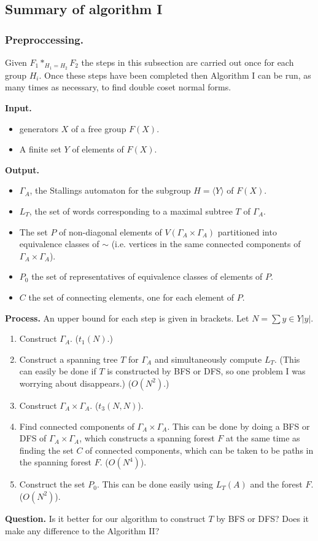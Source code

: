 \documentclass[a4paper,12pt]{article}
\newcommand{\G}{\Gamma }
\numberwithin{equation}{section}
\numberwithin{figure}{section}
\newcommand{\la}{\langle}
\newcommand{\ra}{\rangle}
\newcommand{\be}{\begin{enumerate}}
\newcommand{\ee}{\end{enumerate}}
\newcommand{\biz}{\begin{itemize}}
\newcommand{\eiz}{\end{itemize}}
\begin{document}
\subsection{Summary of algorithm I}
\subsubsection{Preproccessing.}
Given $F_1*_{H_1=H_2} F_2$
 the
steps in this subsection are carried out once for
each group $H_i$. Once these steps have been completed
then Algorithm I can be run, as many times as necessary,
to find double coset normal forms.

\noindent\textbf{Input.}
\biz
\item generators $X$ of a free group $F(X)$.
\item A finite set $Y$ of elements of $F(X)$.
\eiz
\noindent\textbf{Output.}
\biz
\item
$\G_A$, the Stallings automaton for the subgroup $H=\la Y\ra$ of $F(X)$.
\item
$L_T$, the set of words corresponding to a  maximal subtree $T$ of $\G_A$.
\item The set $P$ of non-diagonal elements of $V( \G_A\times \G_A)$
partitioned into equivalence classes of $\sim$ (i.e. vertices in the
same connected components of $\G_A\times \G_A$).
\item $P_0$ the set of representatives of equivalence classes of
elements of $P$.
\item $C$ the set of connecting elements, one for each element of $P$.
\eiz
\noindent\textbf{Process.}
An upper bound for each step is given in brackets.
Let $N=\sum{y\in Y} |y|$.
\be
\item Construct $\G_A$. ($t_1(N)$.)
\item Construct a spanning tree $T$ for $\G_A$ and simultaneously
compute $L_T$. (This can easily be done if $T$ is constructed by
BFS or DFS, so one problem I was worrying about disappears.) ($O(N^2)$.)
\item Construct $\G_A\times \G_A$. ($t_3(N,N)$).
\item Find connected components of $\G_A\times \G_A$. This can be
done by doing a BFS or DFS of $\G_A\times \G_A$, which constructs
a spanning forest $F$ at the same time as finding the set $C$ of
connected components,
which can be taken to be paths in the spanning forest $F$.
($O(N^4)$).
\item Construct the set $P_0$. This can be done easily using $L_T(A)$ and
the forest $F$. ($O(N^2)$).
\ee
\noindent\textbf{Question.} Is it better for our algorithm
to construct $T$ by BFS or DFS? Does it make any difference to the
Algorithm II?
\end{document}
